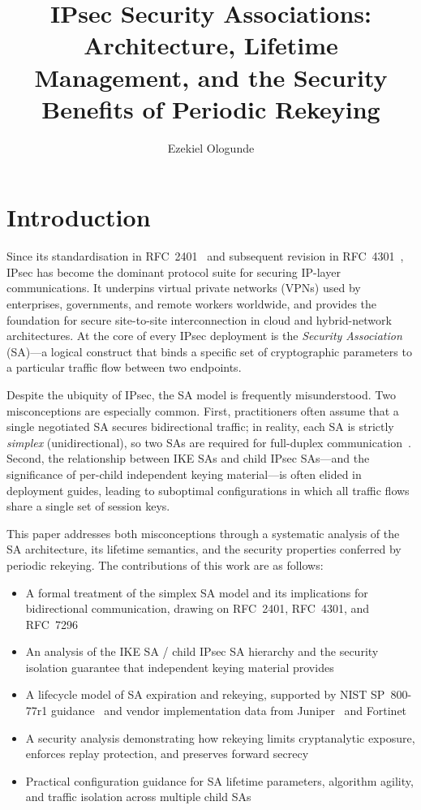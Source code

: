 \documentclass[sigconf,nonacm]{acmart}
\title{IPsec Security Associations: Architecture, Lifetime Management, and the Security Benefits of Periodic Rekeying}
\author{Ezekiel Ologunde}
\affiliation{\institution{Independent Researcher}\city{Boston}\state{MA}\country{USA}}
\begin{document}
\hfuzz=5pt
\maketitle

\section{Introduction}

Since its standardisation in RFC~2401~\cite{rfc2401} and subsequent revision in
RFC~4301~\cite{rfc4301}, IPsec has become the dominant protocol suite for securing
IP-layer communications. It underpins virtual private networks (VPNs) used by
enterprises, governments, and remote workers worldwide, and provides the foundation
for secure site-to-site interconnection in cloud and hybrid-network architectures.
At the core of every IPsec deployment is the \emph{Security Association} (SA)---a
logical construct that binds a specific set of cryptographic parameters to a
particular traffic flow between two endpoints.

Despite the ubiquity of IPsec, the SA model is frequently misunderstood. Two
misconceptions are especially common. First, practitioners often assume that a single
negotiated SA secures bidirectional traffic; in reality, each SA is strictly
\emph{simplex} (unidirectional), so two SAs are required for full-duplex
communication~\cite{rfc2401}. Second, the relationship between IKE SAs and child
IPsec SAs---and the significance of per-child independent keying material---is often
elided in deployment guides, leading to suboptimal configurations in which all traffic
flows share a single set of session keys.

This paper addresses both misconceptions through a systematic analysis of the SA
architecture, its lifetime semantics, and the security properties conferred by periodic
rekeying. The contributions of this work are as follows:

\begin{itemize}
  \item A formal treatment of the simplex SA model and its implications for
        bidirectional communication, drawing on RFC~2401, RFC~4301, and RFC~7296
  \item An analysis of the IKE SA / child IPsec SA hierarchy and the security
        isolation guarantee that independent keying material provides
  \item A lifecycle model of SA expiration and rekeying, supported by NIST SP~800-77r1
        guidance~\cite{nist80077} and vendor implementation data from Juniper~\cite{juniper}
        and Fortinet~\cite{fortinet}
  \item A security analysis demonstrating how rekeying limits cryptanalytic exposure,
        enforces replay protection, and preserves forward secrecy
  \item Practical configuration guidance for SA lifetime parameters, algorithm agility,
        and traffic isolation across multiple child SAs
\end{itemize}
\end{document}
